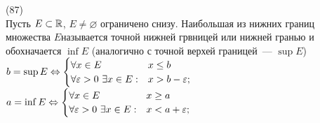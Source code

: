 (87)\\
Пусть $E \subset \mathbb{R}$, $E \neq \varnothing$ ограничено снизу. Наибольшая из нижних  границ множества $E$называется точной нижней  грвницей или нижней гранью и обохначается $\inf E$ (аналогично с точной верхей границей~--- $\sup E$)\\
$b = \sup E \Leftrightarrow 
\begin{cases}
\forall x \in E & x \le b\\
\forall\varepsilon > 0\ \exists x \in E: & x > b - \varepsilon;	
\end{cases}$\\
$a = \inf E \Leftrightarrow
\begin{cases}
\forall x \in E & x \ge a\\
\forall\varepsilon > 0\ \exists x \in E: & x < a + \varepsilon;	
\end{cases}$
